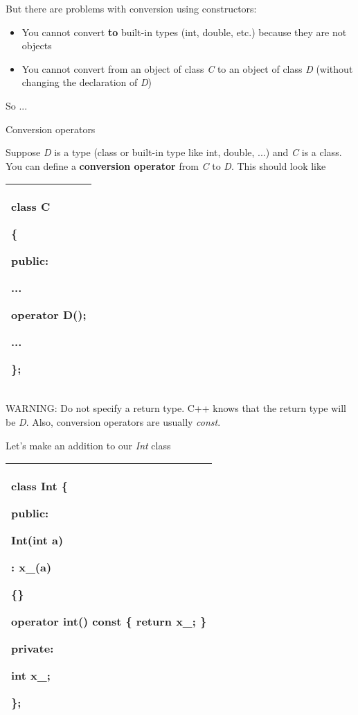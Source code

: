 \documentclass[
]{article}
\providecommand{\tightlist}{%
  \setlength{\itemsep}{0pt}\setlength{\parskip}{0pt}}
\begin{document}
But there are problems with conversion using constructors:

\begin{itemize}
\tightlist
\item
  You cannot convert \textbf{to} built-in types (int, double, etc.)
  because they are not objects
\item
  You cannot convert from an object of class \emph{C} to an object of
  class \emph{D} (without changing the declaration of \emph{D})
\end{itemize}

So ...

Conversion operators

Suppose \emph{D} is a type (class or built-in type like int, double,
...) and \emph{C} is a class. You can define a \textbf{conversion
operator} from \emph{C} to \emph{D}. This should look like

\begin{longtable}[]{@{}l@{}}
\toprule
\endhead
\begin{minipage}[t]{0.97\columnwidth}\raggedright
class C

\{

public:

...

operator D();

...

\};\strut
\end{minipage}\tabularnewline
\bottomrule
\end{longtable}

WARNING: Do not specify a return type. C++ knows that the return type
will be \emph{D}. Also, conversion operators are usually \emph{const}.

Let's make an addition to our \emph{Int} class

\begin{longtable}[]{@{}l@{}}
\toprule
\endhead
\begin{minipage}[t]{0.97\columnwidth}\raggedright
class Int \{

public:

Int(int a)

: x\_(a)

\{\}

\textbf{operator int() const \{ return x\_; \}}

private:

int x\_;

\};\strut
\end{minipage}\tabularnewline
\bottomrule
\end{longtable}
\end{document}
